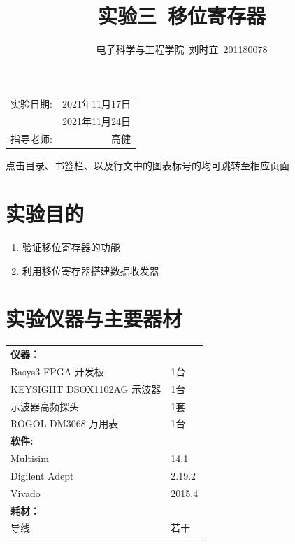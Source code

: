 \documentclass[UTF8]{ctexart}
\title{\textbf{实验三\ 移位寄存器}} %
\author{电子科学与工程学院\ 刘时宜\ 201180078} %
\date{} %
\numberwithin{figure}{subsection}
\numberwithin{table}{subsection}
\numberwithin{equation}{subsection}
\begin{document}
\pagestyle{EE_Digital1Exp_template}

\maketitle %

\begin{center}
    \begin{tabular}{l r}
    实验日期: & 2021年11月17日 \\ %
     & 2021年11月24日 \\ %
    指导老师: & 高健 %
    \end{tabular}
    \par 点击目录、书签栏、以及行文中的图表标号的均可跳转至相应页面
    \end{center}
    

\tableofcontents

\section{实验目的}
\begin{enumerate}
    \item 验证移位寄存器的功能
    \item 利用移位寄存器搭建数据收发器
\end{enumerate}

\section{实验仪器与主要器材}
\begin{center}
    \begin{tabular}{ll}
        \textbf{仪器：} & \\
        Basys3 FPGA 开发板 & 1台\\
        KEYSIGHT DSOX1102AG 示波器 & 1台\\
        示波器高频探头 & 1套\\
        ROGOL DM3068 万用表 & 1台\\
        \textbf{软件:} & \\
        Multisim & 14.1 \\
        Digilent Adept & 2.19.2 \\
        Vivado & 2015.4 \\
        \textbf{耗材：} & \\
        导线 & 若干 \\
    \end{tabular}
\end{center}
\end{document}
